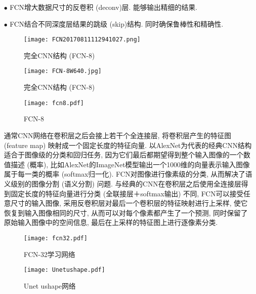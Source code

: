 $\bullet$ FCN增大数据尺寸的反卷积 (deconv)层. 能够输出精细的结果.

$\bullet$ FCN结合不同深度层结果的跳级 (skip)结构. 同时确保鲁棒性和精确性.
\begin{figure}[H]
    \centering
    \texttt{[image: FCN20170811112941027.png]}
    \caption{完全CNN结构 (FCN-8) \cite{}}
    \label{FCN20170811112941027}
    \vspace{-0.4cm}
\end{figure}

\begin{figure}[H]
    \centering
    \texttt{[image: FCN-8W640.jpg]}
    \caption{完全CNN结构 (FCN-8) \cite{PiramanayagamSaber2018-9591}}
    \label{FCN-8W640}
    \vspace{-0.4cm}
\end{figure}
\begin{figure}[H]
    \centering
    \texttt{[image: fcn8.pdf]}
    \caption{FCN-8}
    \label{CNNfcn80203}\vspace{-0.4cm}
\end{figure}
通常CNN网络在卷积层之后会接上若干个全连接层, 将卷积层产生的特征图 (feature map) 映射成一个固定长度的特征向量.
以AlexNet为代表的经典CNN结构适合于图像级的分类和回归任务, 因为它们最后都期望得到整个输入图像的一个数值描述 (概率), 比如AlexNet的ImageNet模型输出一个1000维的向量表示输入图像属于每一类的概率 (softmax归一化).
FCN对图像进行像素级的分类, 从而解决了语义级别的图像分割 (语义分割) 问题.
与经典的CNN在卷积层之后使用全连接层得到固定长度的特征向量进行分类 (全联接层＋softmax输出) 不同, FCN可以接受任意尺寸的输入图像, 采用反卷积层对最后一个卷积层的特征映射进行上采样,
使它恢复到输入图像相同的尺寸, 从而可以对每个像素都产生了一个预测, 同时保留了原始输入图像中的空间信息, 最后在上采样的特征图上进行逐像素分类.
\begin{figure}[H]
    \centering
    \texttt{[image: fcn32.pdf]}
    \caption{FCN-32学习网络}
    \label{CNNfcn320203}
    \vspace{-0.4cm}
\end{figure}
\begin{figure}[H]
    \centering
    \texttt{[image: Unetushape.pdf]}
    \caption{Unet ushape网络}
    \label{CNNUnetushape0203}
    \vspace{-0.4cm}
\end{figure}

